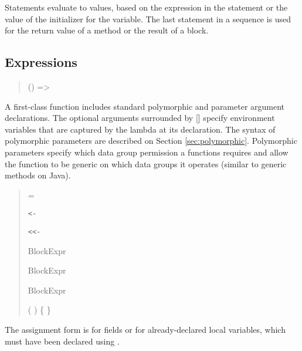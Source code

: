 Statements evaluate to values, based on the expression in the
statement or the value of the initializer for the variable.  The last
statement in a sequence is used for the return value of a method or
the result of a block.

\subsection{Expressions}

\begin{quote}



 {}   ()
              => 

 {}

\end{quote}

A first-class function includes standard polymorphic and parameter
argument declarations. The optional arguments surrounded by [] specify
environment variables that are captured by the lambda at its declaration.
The syntax of polymorphic parameters are described on
Section \ref{sec:polymorphic}. Polymorphic parameters specify which
data group permission a functions requires and allow the function to
be generic on which data groups it operates (similar to generic
methods on Java).
  
\begin{quote}


 {}  = 

 {} \texttt{<- }

 {} \texttt{<{}<-} 

 {}   BlockExpr

 {}   BlockExpr

 {} BlockExpr

 {} (  ) \{  \}

 {}

\end{quote}

The assignment form is for fields or for already-declared local
variables, which must have been declared using . 

